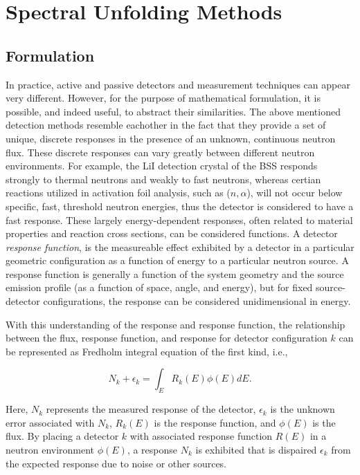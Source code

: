 \section{Spectral Unfolding Methods}


\subsection{Formulation}


In practice, active and passive detectors and measurement techniques can appear very different.
However, for the purpose of mathematical formulation, it is possible, and indeed useful, to abstract their similarities.
The above mentioned detection methods resemble eachother in the fact that they provide a set of unique, discrete responses in the presence of an unknown, continuous neutron flux.
These discrete responses can vary greatly between different neutron environments.
For example, the LiI detection crystal of the BSS responds strongly to thermal neutrons and weakly to fast neutrons, whereas certian reactions utilized in activation foil analysis, such as ($n, \alpha$), will not occur below specific, fast, threshold neutron energies, thus the detector is considered to have a fast response.
These largely energy-dependent responses, often related to material properties and reaction cross sections, can be considered functions.
A detector {\it response function}, is the measureable effect exhibited by a detector in a particular geometric configuration as a function of energy to a particular neutron source.
A response function is generally a function of the system geometry and the source emission profile (as a function of space, angle, and energy), but for fixed source-detector configurations, the response can be considered unidimensional in energy.

With this understanding of the response and response function, the relationship between the flux, response function, and response for detector configuration $k$ can be represented as Fredholm integral equation of the first kind, i.e.,

\begin{equation}
\label{eqn:cont-response}
N_k + \epsilon_k = \int_E R_k(E) \phi(E) dE .
\end{equation}

\noindent
Here, $N_k$ represents the measured response of the detector, $\epsilon_k$ is the unknown error associated with $N_k$, $R_k(E)$ is the response function, and $\phi(E)$ is the flux.
By placing a detector $k$ with associated response function $R(E)$ in a neutron environment $\phi(E)$, a response $N_k$ is exhibited that is dispaired $\epsilon_k$ from the expected response due to noise or other sources.

